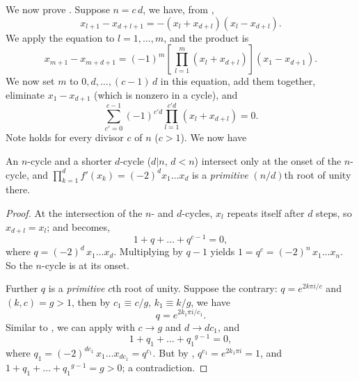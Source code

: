 \documentclass{ws-ijbc}
\begin{document}


We now prove .
Suppose $n = c \,d$, we have, from ,
\[
  x_{l+1} - x_{d+l+1} = - (x_l + x_{d+l}) (x_l - x_{d+l}).
\]
We apply the equation to $l = 1, \ldots, m$, and the product is
\[
  x_{m+1} - x_{m + d+1} =
  (-1)^{m} \left[ \, \prod_{l=1}^{m} (x_l + x_{d+l}) \right]
    (x_1 - x_{d+1}).
\]
We now set $m$ to $0, d, \ldots, (c-1)\,d$ in this equation,
  add them together, eliminate $x_1 - x_{d+1}$
  (which is nonzero in a cycle), and
\begin{equation}
  \sum_{c' = 0}^{c-1}
    (-1)^{c' d} \prod_{l=1}^{c' d} (x_l + x_{d+l})
   = 0.
\label{eq:stair}
\end{equation}
%
Note  holds for every divisor $c$ of $n$ ($c > 1$). We now have



\begin{theorem}
An $n$-cycle and a shorter $d$-cycle ($d|n$, $d< n$)
  intersect only at the onset of the $n$-cycle,
%
and $\prod_{k=1}^{d} f'(x_k) = (-2)^d x_1 \dots x_d$ is
a \emph{primitive} $(n/d)$th root of unity there.
\label{thm:cbifur}
\end{theorem}


\begin{proof}
At the intersection of the $n$- and $d$-cycles,
  $x_l$ repeats itself after $d$ steps, so
  $x_{d + l} = x_l$;
and  becomes,
%
\begin{equation}
  1 + q + \dots + q^{c-1} = 0,
\label{eq:cbifur}
\end{equation}
%
where $q = (-2)^d \, x_1 \dots x_d$.
%
Multiplying  by $q - 1$ yields
  $1 = q^c = (-2)^n \, x_1 \dots x_n$.
So the $n$-cycle is at its onset.


Further $q$ is a \emph{primitive} $c$th root of unity.
%
Suppose the contrary: $q = e^{2k\pi i/c}$ and $(k, c) = g >1$,
  then by $c_1 \equiv c/g$, $k_1 \equiv k/g$, we have
\begin{equation}
  q = e^{2k_1\pi i/ c_1}.
\label{eq:qd}
\end{equation}
Similar to , we can apply  with $c \rightarrow g$ and $d \rightarrow d c_1$, and
\[
  1 + q_1 + \dots + {q_1}^{g-1} = 0,
\]
  where $q_1 = (-2)^{d c_1} \, x_1 \dots x_{dc_1} = q^{c_1}$.
But by , $q^{c_1} = e^{2 k_1\pi i} = 1$,
and $1 + q_1 + \dots + {q_1}^{g-1} = g > 0$; a contradiction.
%
\end{proof}
\end{document}
